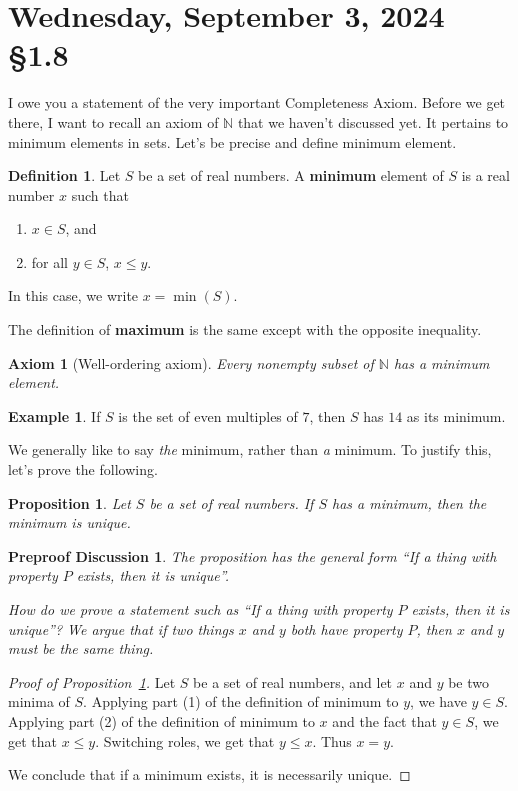 \documentclass[12pt]{amsart}
\def\We{Wednesday}
\newcommand{\N}{\mathbb{N}}
\numberwithin{equation}{section}
\theoremstyle{plain} %
\newtheorem{preproof}{Preproof Discussion}
\newtheorem{prop}[equation]{Proposition}
\newtheorem{axiom}[equation]{Axiom}
\newcommand{\Sept}[3]{\section{#2, September #1, 2024 \quad \S#3}}
\theoremstyle{definition}
\newtheorem{defn}[equation]{Definition}
\newtheorem{ex}[equation]{Example}
\theoremstyle{remark}
\begin{document}
\Sept{3}{\We}{1.8}

I owe you a statement of the very important Completeness Axiom. Before we get there, I want to recall an axiom of $\N$ that we haven't discussed yet. It pertains to minimum elements in sets. Let's be precise and define minimum element.

\begin{defn} Let $S$ be a set of real numbers. A \textbf{minimum} element of $S$ is a real number $x$ such that
\begin{enumerate}\item $x\in S$, and
\item for all $y\in S$, $x\leq y$.
\end{enumerate}
In this case, we write $x=\min(S)$.\index{$\min$}
\end{defn}
The definition of \textbf{maximum} is the same except with the opposite inequality.

\begin{axiom}[Well-ordering axiom]\label{Well-ordering axiom}
	Every nonempty subset of $\N$ has a minimum element.
\end{axiom}

\begin{ex} If $S$ is the set of even multiples of $7$, then $S$ has $14$ as its minimum.
\end{ex}

We generally like to say \emph{the} minimum, rather than \emph{a} minimum. To justify this, let's prove the following.

\begin{prop}\label{prop:min-unique} Let $S$ be a set of real numbers. If $S$ has a minimum, then the minimum is unique.
\end{prop}


\begin{preproof} The proposition has the general form ``If a thing with property $P$ exists, then it is unique''. 
	
  How do we prove a statement such as
  ``If a thing with property $P$ exists, then it is unique''?
  We argue that if two things $x$ and $y$ both have property $P$, then $x$ and $y$ must be the same thing.
\end{preproof}

\begin{proof}[Proof of Proposition~\ref{prop:min-unique}] Let $S$ be a set of real numbers, and let $x$ and $y$ be two minima of $S$. Applying part (1) of the definition of minimum to $y$, we have $y\in S$. Applying part (2) of the definition of minimum to $x$ and the fact that $y\in S$, we get that $x\leq y$. Switching roles, we get that $y\leq x$. Thus $x=y$.

We conclude that if a minimum exists, it is necessarily unique.
\end{proof}
\end{document}
